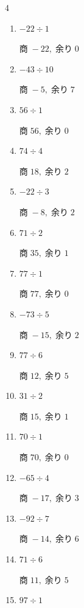 \begin{multicols}{4}
\begin{enumerate}
        $商\; -5,\; 余り\; 0$

  \item $-22 \div 1$

        $商\; -22,\; 余り\; 0$

  \item $-43 \div 10$

        $商\; -5,\; 余り\; 7$

  \item $56 \div 1$

        $商\; 56,\; 余り\; 0$

  \item $74 \div 4$

        $商\; 18,\; 余り\; 2$

  \item $-22 \div 3$

        $商\; -8,\; 余り\; 2$

  \item $71 \div 2$

        $商\; 35,\; 余り\; 1$

  \item $77 \div 1$

        $商\; 77,\; 余り\; 0$

  \item $-73 \div 5$

        $商\; -15,\; 余り\; 2$

  \item $77 \div 6$

        $商\; 12,\; 余り\; 5$

  \item $31 \div 2$

        $商\; 15,\; 余り\; 1$

  \item $70 \div 1$

        $商\; 70,\; 余り\; 0$

  \item $-65 \div 4$

        $商\; -17,\; 余り\; 3$

  \item $-92 \div 7$

        $商\; -14,\; 余り\; 6$

\columnbreak %

  \item $71 \div 6$

        $商\; 11,\; 余り\; 5$

  \item $97 \div 1$


\end{enumerate}
\end{multicols}
